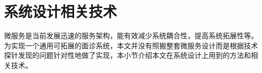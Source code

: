 %
%
%
%
%

\section{系统设计相关技术}
微服务是当前发展迅速的服务架构\cite{jamshidi2018microservices}，能有效减少系统耦合性，提高系统拓展性等。
为实现一个通用可拓展的面诊系统，本文并没有照搬整套微服务设计而是根据技术探针发现的问题针对性地做了实现，本小节介绍本文在系统设计上用到的方法和相关技术。

